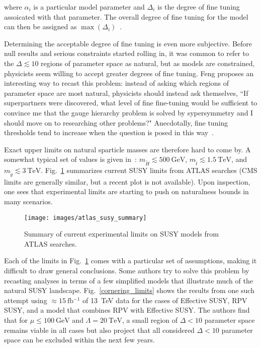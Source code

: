 \documentclass[12pt]{article}
\begin{document}
    \noindent where $\alpha_i$ is a particular model parameter and $\Delta_i$ is the degree of fine tuning assoicated with that parameter. The overall degree of fine tuning for the model can then be assigned as $\max{\left(\Delta_i\right)}$~\cite{cornering}.

    Determining the acceptable degree of fine tuning is even more subjective. Before null results and serious constraints started rolling in, it was common to refer to the $\Delta \lesssim 10$ regions of parameter space as natural, but as models are constrained, physicists seem willing to accept greater degrees of fine tuning. Feng proposes an interesting way to recast this problem: instead of asking which regions of parameter space are most natural, physicists should instead ask themselves, ``If superpartners were discovered, what level of fine fine-tuning would be sufficient to convince me that the gauge hierarchy problem is solved by sypersymmetry and I should move on to researching other problems?" Anecdotally, fine tuning thresholds tend to increase when the question is posed in this way~\cite{feng}.

    Exact upper limits on natural sparticle masses are therefore hard to come by. A somewhat typical set of values is given in~\cite{drees_kim}: $m_{\tilde{H}} \lesssim \SI{500}{\giga\electronvolt}$, $m_{\tilde{t}} \lesssim \SI{1.5}{\tera\electronvolt}$, and $m_{\tilde{g}} \lesssim \SI{3}{\tera\electronvolt}$. Fig.~\ref{atlas_susy_summary} summarizes current SUSY limits from ATLAS searches (CMS limits are generally similar, but a recent plot is not available). Upon inspection, one sees that experimental limits are starting to push on naturalness bounds in many scenarios.

    \noindent \begin{figure}[htbp] \begin{center}
    \texttt{[image: images/atlas\_susy\_summary]}
    \caption{Summary of current experimental limits on SUSY models from ATLAS searches.}
    \label{atlas_susy_summary}
    \end{center} \end{figure}

    Each of the limits in Fig.~\ref{atlas_susy_summary} comes with a particular set of assumptions, making it difficult to draw general conclusions. Some authors try to solve this problem by recasting analyses in terms of a few simplified models that illustrate much of the natural SUSY landscape. Fig.~\ref{cornering_limits} shows the results from one such attempt using $\approx \SI{15}{\femto\barn^{-1}}$ of \SI{13}{\tera\electronvolt} data for the cases of Effective SUSY, RPV SUSY, and a model that combines RPV with Effective SUSY. The authors find that for $\mu \leq \SI{100}{\giga\electronvolt}$ and $\Lambda = \SI{20}{\tera\electronvolt}$, a small region of $\Delta < 10$ parameter space remains viable in all cases but also project that all considered $\Delta < 10$ parameter space can be excluded within the next few years.
    
\end{document}
